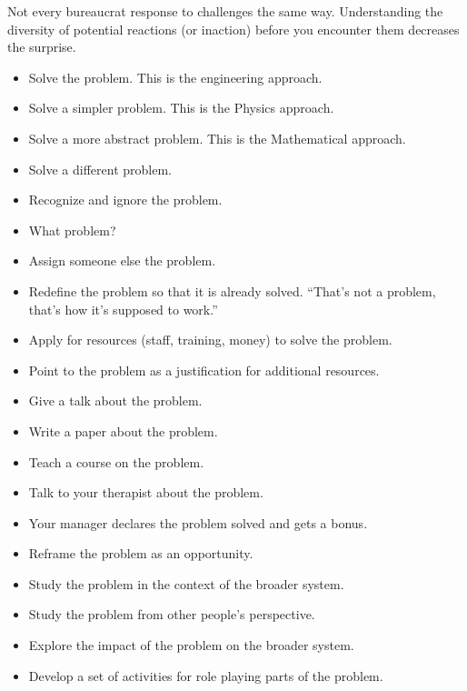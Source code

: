 

Not every bureaucrat response to challenges the same way. Understanding the diversity of potential reactions (or inaction) before you encounter them decreases the surprise. 

\begin{itemize}
    \item Solve the problem. This is the engineering approach.
    \item Solve a simpler problem. This is the Physics approach.
    \item Solve a more abstract problem. This is the Mathematical approach.
    \item Solve a different problem.
    \item Recognize and ignore the problem. 
    \item What problem?
    \item Assign someone else the problem.
    \item Redefine the problem so that it is already solved. ``That's not a problem, that's how it's supposed to work.''
    \item Apply for resources (staff, training, money) to solve the problem.
    \item Point to the problem as a justification for additional resources.
    \item Give a talk about the problem.
    \item Write a paper about the problem.
    \item Teach a course on the problem.
    \item Talk to your therapist about the problem.
    \item Your manager declares the problem solved and gets a bonus.
    \item Reframe the problem as an opportunity. 
    \item Study the problem in the context of the broader system.
    \item Study the problem from other people's perspective.
    \item Explore the impact of the problem on the broader system.
    \item Develop a set of activities for role playing parts of the problem. 

\end{itemize}
